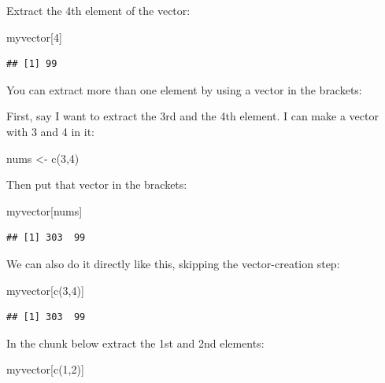 \documentclass[
]{book}
\newenvironment{Shaded}{\begin{snugshade}}{\end{snugshade}}
\newcommand{\DecValTok}[1]{\textcolor[rgb]{0.00,0.00,0.81}{#1}}
\newcommand{\FunctionTok}[1]{\textcolor[rgb]{0.00,0.00,0.00}{#1}}
\newcommand{\NormalTok}[1]{#1}
\newcommand{\OtherTok}[1]{\textcolor[rgb]{0.56,0.35,0.01}{#1}}
\begin{document}
Extract the 4th element of the vector:

\begin{Shaded}
\begin{Highlighting}[]
\NormalTok{myvector[}\DecValTok{4}\NormalTok{]}
\end{Highlighting}
\end{Shaded}

\begin{verbatim}
## [1] 99
\end{verbatim}

You can extract more than one element by using a vector in the brackets:

First, say I want to extract the 3rd and the 4th element. I can make a vector with 3 and 4 in it:

\begin{Shaded}
\begin{Highlighting}[]
\NormalTok{nums }\OtherTok{\textless{}{-}} \FunctionTok{c}\NormalTok{(}\DecValTok{3}\NormalTok{,}\DecValTok{4}\NormalTok{)}
\end{Highlighting}
\end{Shaded}

Then put that vector in the brackets:

\begin{Shaded}
\begin{Highlighting}[]
\NormalTok{myvector[nums]}
\end{Highlighting}
\end{Shaded}

\begin{verbatim}
## [1] 303  99
\end{verbatim}

We can also do it directly like this, skipping the vector-creation step:

\begin{Shaded}
\begin{Highlighting}[]
\NormalTok{myvector[}\FunctionTok{c}\NormalTok{(}\DecValTok{3}\NormalTok{,}\DecValTok{4}\NormalTok{)]}
\end{Highlighting}
\end{Shaded}

\begin{verbatim}
## [1] 303  99
\end{verbatim}

In the chunk below extract the 1st and 2nd elements:

\begin{Shaded}
\begin{Highlighting}[]
\NormalTok{myvector[}\FunctionTok{c}\NormalTok{(}\DecValTok{1}\NormalTok{,}\DecValTok{2}\NormalTok{)]}
\end{Highlighting}
\end{Shaded}
\end{document}
